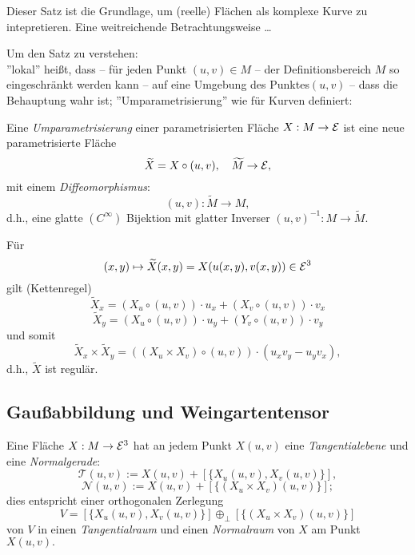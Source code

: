 \begin{remark}
	
	Dieser Satz ist die Grundlage, um (reelle) Flächen als komplexe Kurve zu intepretieren. Eine weitreichende Betrachtungsweise \ldots
\end{remark}

\begin{remark}
	
	Um den Satz zu verstehen:\\
	''lokal'' heißt, dass -- für jeden Punkt $ (u,v) \in M $ -- der Definitionsbereich $M$ so eingeschränkt werden kann -- auf eine Umgebung des Punktes$ (u,v) $ -- dass die Behauptung wahr ist;
	''Umparametrisierung'' wie für Kurven definiert:
\end{remark}

\begin{definition}
	
	Eine \emph{Umparametrisierung} einer parametrisierten Fläche $ X: M \rightarrow \mathcal E $ ist eine neue parametrisierte Fläche 
		\[ \widetilde{X}=X\circ(u,v), \quad \widetilde{M} \rightarrow \mathcal E, \]
	mit einem \emph{Diffeomorphismus}: 
		\[ (u,v): \widetilde{M} \rightarrow M, \] 
	d.h., eine glatte $ (C^\infty) $ Bijektion mit glatter Inverser $ (u,v)^{-1}:M \rightarrow \widetilde{M}. $
		
\end{definition}

\begin{remark}
	
	Für \[(x,y)\mapsto \widetilde{X}(x,y) = X(u(x,y),v(x,y)) \in \mathcal E^3  \] gilt (Kettenregel) \[ \widetilde{X}_x = (X_u\circ (u,v))\cdot u_x + (X_v \circ (u,v)) \cdot v_x \]
	\[ \widetilde{X}_y = (X_u \circ (u,v))\cdot u_y + (Y_v \circ (u,v)) \cdot v_y \]
	und somit 
		\[ \widetilde{X}_x \times \widetilde{X}_y = ((X_u\times X_v)\circ (u,v))\cdot (u_xv_y - u_yv_x), \]
	d.h., $ \widetilde{X} $ ist regulär.
	
\end{remark}

\subsection{Gaußabbildung und Weingartentensor}

\begin{definition}
	
	Eine Fläche $ X : M \rightarrow \mathcal E^3 $ hat an jedem Punkt $ X(u,v) $ eine \emph{Tangentialebene} und eine \emph{Normalgerade}:
		\[ \mathcal{T}(u,v) := X(u,v) + [ \{ X_u(u,v), X_v(u,v) \} ], \]
		\[ \mathcal{N}(u,v) := X(u,v) + [ \{ (X_u \times X_v)(u,v) \} ]; \]
	dies entspricht einer orthogonalen Zerlegung
		\[ V= [ \{ X_u(u,v),X_v(u,v) \} ] \oplus_\perp [ \{ (X_u \times X_v)(u,v) \} ] \]
	von $ V $ in einen \emph{Tangentialraum} und einen \emph{Normalraum} von $X$ am Punkt $X(u,v).$
	
\end{definition}
	
